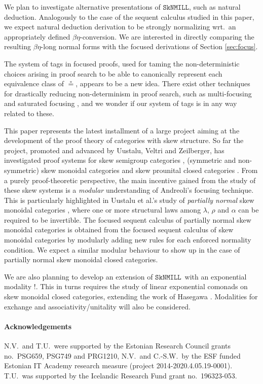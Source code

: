\documentclass[copyright,creativecommons]{eptcs}
\theoremstyle{definition}
\newcommand{\SkNMILL}{$\mathtt{SkNMILL}$}
\begin{document}
We plan to investigate alternative presentations of \SkNMILL, such as natural deduction. Analogously to the case of the sequent calculus studied in this paper, we expect natural deduction derivation to be strongly normalizing wrt.\ an appropriately defined $\beta\eta$-conversion. We are interested in directly comparing the resulting $\beta\eta$-long normal forms with the focused derivations of Section \ref{sec:focus}.

The system of tags in focused proofs, used for taming the non-deterministic choices arising in proof search to be able to canonically represent each equivalence class of $\circeq$, appears to be a new idea. %
There exist other techniques for drastically reducing non-determinism in proof search, such as multi-focusing \cite{chaudhuri:canonical:2008} and saturated focusing \cite{scherer:simple:2015}, and we wonder if our system of tags is in any way related to these. %

This paper represents the latest installment of a large project aiming at the development of the proof theory of categories with skew structure. So far the project, promoted and advanced by Uustalu, Veltri and Zeilberger, has investigated proof systems for skew semigroup categories \cite{zeilberger:semiassociative:19}, (symmetric and non-symmetric) skew monoidal categories \cite{uustalu:sequent:2021,uustalu:proof:nodate,veltri:coherence:2021} and skew prounital closed categories \cite{uustalu:deductive:nodate}. From a purely proof-theoretic perspective, the main incentive gained from the study of these skew systems is a \emph{modular} understanding of Andreoli's focusing technique. This is particularly highlighted in Uustalu et al.'s study of \emph{partially normal} skew monoidal categories \cite{uustalu:proof:nodate}, where one or more structural laws among $\lambda$, $\rho$ and $\alpha$ can be required to be invertible. The focused sequent calculus of partially normal skew monoidal categories is obtained from the focused sequent calculus of skew monoidal categories by modularly adding new rules for each enforced normality condition.
We expect a similar modular behaviour to show up in the case of partially normal skew monoidal closed categories.

We are also planning to develop an extension of \SkNMILL\ with an exponential modality $!$. This in turns requires the study of linear exponential comonads on skew monoidal closed categories, extending the work of Hasegawa \cite{hasegawa:linear:2017}. Modalities for exchange \cite{jiang:lambek:2019} and associativity/unitality will also be considered.

\paragraph{Acknowledgements} N.V.\ and T.U.\ were supported by the
Estonian Research Council grants no.~PSG659, PSG749 and PRG1210, N.V.\ and
C.-S.W.\ by the ESF funded Estonian IT Academy research measure
(project 2014-2020.4.05.19-0001). T.U.\ was supported by the Icelandic
Research Fund grant no.~196323-053.

  
  
\end{document}
